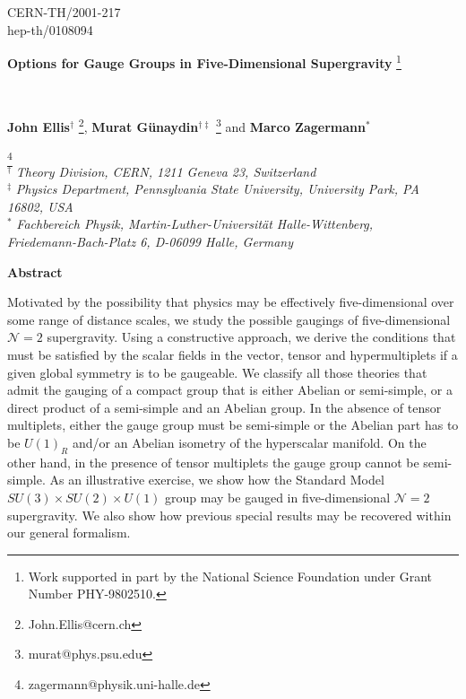 \documentclass[a4paper,11pt]{article}
\begin{document}
\begin{titlepage}
\begin{flushright}
CERN-TH/2001-217\\
hep-th/0108094\\
\end{flushright}
\vspace{0.2cm}
\begin{center}
\begin{LARGE}
\textbf{Options for Gauge Groups in Five-Dimensional Supergravity
}\footnote{ Work supported
  in part by the National
Science Foundation under Grant Number PHY-9802510.}
\end{LARGE}\\
\vspace{1.0cm}
\begin{large}
{\bf John Ellis}$^{\dagger}$ \footnote{John.Ellis@cern.ch}, 
{\bf Murat G\"{u}naydin}$^{\dagger\ddagger}$ \footnote{murat@phys.psu.edu}
and
{\bf Marco Zagermann}$^{\ast}$
\end{large}\footnote{zagermann@physik.uni-halle.de} \\
\vspace{.35cm}
$^{\dagger}$ \emph{Theory Division, CERN,
1211 Geneva 23, Switzerland} \\
\vspace{.3cm}
$^{\ddagger}$ \emph{Physics Department,
Pennsylvania State University,
University Park, PA 16802, USA} \\
\vspace{.3cm}
$^{\ast}$ \emph{Fachbereich Physik,
Martin-Luther-Universit\"{a}t Halle-Wittenberg,\\
Friedemann-Bach-Platz 6, D-06099 Halle, Germany}\\

\vspace{.3cm}

\vspace{0.5cm}
{\bf Abstract}
\end{center}
\begin{small}

Motivated by the possibility that physics may be effectively
five-dimensional over some range of distance scales, we study the possible
gaugings of five-dimensional $\mathcal{N}=2$ supergravity.  Using a
constructive approach, we derive the conditions that must be satisfied by
the scalar fields in the vector, tensor and hypermultiplets if a given
global symmetry is to be gaugeable. We classify all those theories that
admit the gauging of a compact group that is either Abelian or
semi-simple, or a direct product of a semi-simple and an Abelian group. In
the absence of tensor multiplets, either the gauge group must be
semi-simple or the Abelian part has to be $U(1)_R$ and/or an Abelian
isometry of the hyperscalar manifold. On the other hand, in the presence
of tensor multiplets the gauge group cannot be semi-simple. As an
illustrative exercise, we show how the Standard Model $SU(3) \times SU(2) 
\times U(1)$ group may be gauged in five-dimensional $\mathcal{N}=2$
supergravity. We also show how previous special results may be recovered
within our general formalism. 


\end{small}
\end{titlepage}
\end{document}
